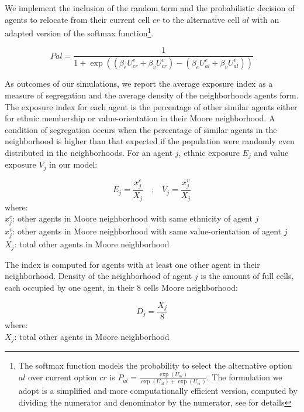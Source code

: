 \documentclass[
]{article}
\begin{document}
We implement the inclusion of the random term and the probabilistic decision of agents to relocate from their current cell $cr$ to the alternative cell $al$ with an adapted version of the softmax function\footnote{The softmax function models the probability to select the alternative option $al$ over current option $cr$ is $P_{al} = \frac{\exp(U_{al})}{\exp(U_{al}) +  \exp(U_{cr})}$. The formulation we adopt is a simplified and more computationally efficient version, computed by dividing the numerator and denominator by the numerator, see \citep[p.39]{train2009discrete} for details}. 

\begin{equation} \label{eq:pal}
    P{al} = \frac{1}{ 1 + \exp((\beta_{e}U^{e}_{cr} + \beta_{v}U^{v}_{cr}) - (\beta_{e}U^{e}_{al} + \beta_{v}U^{v}_{al}))}
\end{equation}\newline

As outcomes of our simulations, we report the average exposure index as a measure of segregation and the average density of the neighborhoods agents form.
The exposure index for each agent is the percentage of other similar agents either for ethnic membership or value-orientation in their Moore neighborhood. A condition of segregation occurs when the percentage of similar agents in the neighborhood is higher than that expected if the population were randomly even distributed in the neighborhoods. For an agent $j$, ethnic exposure $E_{j}$ and value exposure $V_{j}$ in our model:

\begin{equation} \label{eq:exposure}
E_{j} = \frac{x^{e}_{j}}{X_{j}}  \quad\text{;}\quad 
V_{j} = \frac{x^{v}_{j}}{X_{j}}
\end{equation}
where:\\
$x^{e}_{j}$: other agents in Moore neighborhood with same ethnicity of agent $j$\\
$x^{v}_{j}$: other agents in Moore neighborhood with same value-orientation of agent $j$\\
$X_{j}$: total other agents in Moore neighborhood\newline

The index is computed for agents with at least one other agent in their neighborhood.\newline
Density of the neighborhood of agent $j$ is the amount of full cells, each occupied by one agent, in their 8 cells Moore neighborhood:

\begin{equation}\label{density}
D_{j} = \frac{X_{j}}{8}
\end{equation}
where:\\
$X_{j}$: total other agents in Moore neighborhood\newline
\end{document}
